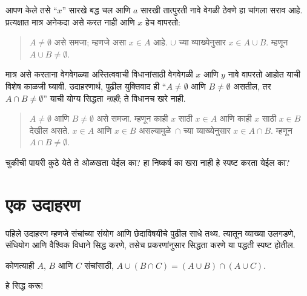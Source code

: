 आपण केले तसे “$x$” सारखे बद्ध चल आणि $a$ सारखी तात्पुरती नावे वेगळी ठेवणे हा चांगला सराव आहे. प्रत्यक्षात मात्र अनेकदा असे करत नाही आणि $x$ हेच वापरतो:
\begin{quote}
$A \neq \emptyset$ असे समजा; म्हणजे असा $x \in A$ आहे. $\cup$ च्या व्याख्येनुसार $x \in A \cup B$. म्हणून $A \cup B \neq \emptyset$.
\end{quote}
मात्र असे करताना वेगवेगळ्या अस्तित्ववाची विधानांसाठी वेगवेगळी $x$ आणि $y$ नावे वापरतो आहोत याची विशेष काळजी घ्यावी. उदाहरणार्थ, पुढील युक्तिवाद ही “$A \neq \emptyset$ आणि $B \neq \emptyset$ असतील, तर $A \cap B \neq \emptyset$” याची योग्य सिद्धता \emph{नाही}; ते विधानच खरे नाही.
\begin{quote}
$A \neq \emptyset$ आणि $B \neq \emptyset$ असे समजा. म्हणून काही $x$ साठी $x \in A$ आणि काही $x$ साठी $x \in B$ देखील असते. $x \in A$ आणि $x \in B$ असल्यामुळे~$\cap$ च्या व्याख्येनुसार $x \in A \cap B$. म्हणून $A \cap B \neq \emptyset$.
\end{quote}
चुकीची पायरी कुठे येते ते ओळखता येईल का? हा निष्कर्ष का खरा नाही हे स्पष्ट करता येईल का?












\section{एक उदाहरण}\label{mth:prf:ex1:sec}

पहिले उदाहरण म्हणजे संचांच्या संयोग आणि छेदाविषयीचे पुढील साधे तथ्य. त्यातून व्याख्या उलगडणे, संधियोग आणि वैश्विक विधाने सिद्ध करणे, तसेच प्रकरणांनुसार सिद्धता करणे या पद्धती स्पष्ट होतील.

\begin{prop}
कोणत्याही $A$, $B$ आणि $C$ संचांसाठी, $A \cup (B \cap C) = (A \cup B) \cap (A \cup C)$.
\end{prop}

हे सिद्ध करू!{}

